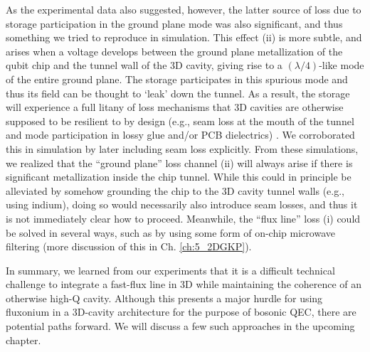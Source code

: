 As the experimental data also suggested, however, the latter source of loss due to storage participation in the ground plane mode was also significant, and thus something we tried to reproduce in simulation. This effect (ii) is more subtle, and arises when a voltage develops between the ground plane metallization of the qubit chip and the tunnel wall of the 3D cavity, giving rise to a $(\lambda/4)$-like mode of the entire ground plane. The storage participates in this spurious mode and thus its field can be thought to `leak' down the tunnel. As a result, the storage will experience a full litany of loss mechanisms that 3D cavities are otherwise supposed to be resilient to by design (e.g., seam loss at the mouth of the tunnel and mode participation in lossy glue and/or PCB dielectrics) \cite{reagor2013reaching,brecht2015demonstration,reagor2016quantum}. We corroborated this in simulation by later including seam loss explicitly. From these simulations, we realized that the ``ground plane'' loss channel (ii) will always arise if there is significant metallization inside the chip tunnel. While this could in principle be alleviated by somehow grounding the chip to the 3D cavity tunnel walls (e.g., using indium), doing so would necessarily also introduce seam losses, and thus it is not immediately clear how to proceed. Meanwhile, the ``flux line'' loss (i) could be solved in several ways, such as by using some form of on-chip microwave filtering \cite{pozar2012microwave} (more discussion of this in Ch. \ref{ch:5_2DGKP}).  

In summary, we learned from our experiments that it is a difficult technical challenge to integrate a fast-flux line in 3D while maintaining the coherence of an otherwise high-Q cavity. Although this presents a major hurdle for using fluxonium in a 3D-cavity architecture for the purpose of bosonic QEC, there are potential paths forward. We will discuss a few such approaches in the upcoming chapter. 

\clearpage
\printbibliography[heading=subbibliography, title = References]